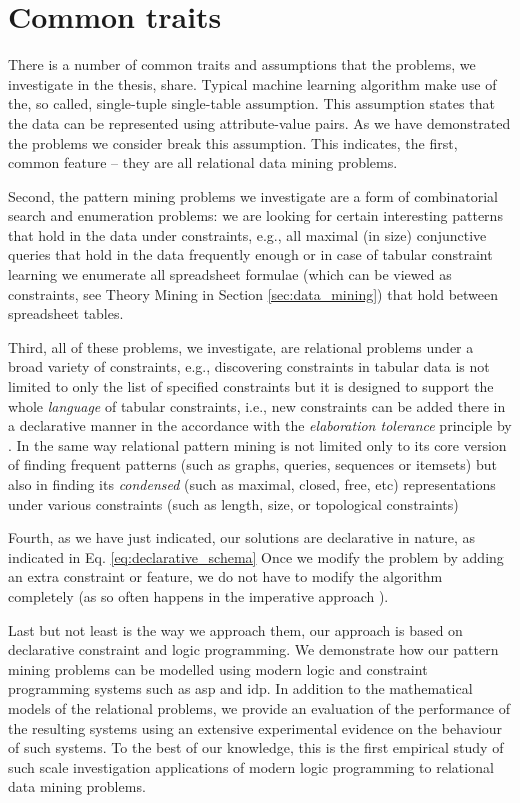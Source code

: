 \pubrev
\section{Common traits}\label{sec:common}
There is a number of common traits and assumptions that the problems, we
investigate in the thesis, share. Typical machine learning algorithm
make use of the, so called, single-tuple single-table assumption. This
assumption states that the data can be represented using
attribute-value pairs. As we have demonstrated the problems we
consider break this assumption. This indicates, the first, common
feature -- they are all relational data  mining problems. 

Second, the pattern mining problems we investigate are a form of combinatorial search and
enumeration problems: we are looking for certain interesting patterns that hold in the data under constraints, e.g., all maximal
(in size) conjunctive queries that hold in the data frequently enough
or in case of tabular constraint learning we enumerate all spreadsheet
formulae (which can be viewed as constraints, see Theory Mining in
Section \ref{sec:data_mining}) that hold between
spreadsheet tables.


Third, all of these problems, we investigate, are relational problems under a
broad variety of constraints, e.g., discovering constraints in tabular
data is not limited to only the list of specified constraints but it
is designed to support the whole \textit{language} of tabular
constraints, i.e., new constraints can be added there in a declarative
manner in the accordance with the \textit{elaboration tolerance}
principle by \textcite{elaboration_tolerance}. In the same way
relational pattern mining is not limited only to its core version of
finding frequent patterns (such as graphs, queries, sequences or
itemsets) but also in finding its \textit{condensed} (such as maximal,
closed, free, etc) representations
under various constraints (such as length, size, or topological
constraints)

Fourth, as we have just indicated, our solutions are declarative in
nature, as indicated in Eq. \ref{eq:declarative_schema} Once we modify
the problem by adding an extra constraint or feature, we do not have
to modify the algorithm completely (as so often happens in the imperative approach \parencite{gspan,clospan}).

Last but not least is the way we approach them, our approach is based
on declarative constraint and logic programming. We demonstrate how
our pattern mining problems can be modelled using modern
logic and constraint programming systems such as \acrshort{asp} and \acrshort{idp}. In addition to the mathematical models
of the relational problems, we provide an evaluation of the
 performance of the resulting systems using an extensive experimental evidence on the behaviour of such systems. To the best of our knowledge, this is the first empirical study of such scale investigation applications of modern logic programming to relational data mining problems.
\pubrevend

